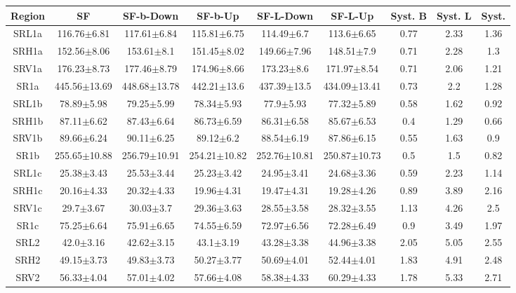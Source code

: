 \documentclass[12pt]{paper}
\begin{document}
\begin{table}[ht]\begin{center}\resizebox{\textwidth}{!}
{\begin{tabular}{c|ccccc|c|c|c}
    Region & SF & SF-b-Down & SF-b-Up & SF-L-Down & SF-L-Up & Syst. B & Syst. L & Syst. \\ 
\hline
SRL1a & 116.76$\pm$6.81 & 117.61$\pm$6.84 & 115.81$\pm$6.75 & 114.49$\pm$6.7 & 113.6$\pm$6.65 & 0.77 & 2.33 & 1.36\\ 
SRH1a & 152.56$\pm$8.06 & 153.61$\pm$8.1 & 151.45$\pm$8.02 & 149.66$\pm$7.96 & 148.51$\pm$7.9 & 0.71 & 2.28 & 1.3\\ 
SRV1a & 176.23$\pm$8.73 & 177.46$\pm$8.79 & 174.96$\pm$8.66 & 173.23$\pm$8.6 & 171.97$\pm$8.54 & 0.71 & 2.06 & 1.21\\ 
\hline
SR1a & 445.56$\pm$13.69 & 448.68$\pm$13.78 & 442.21$\pm$13.6 & 437.39$\pm$13.5 & 434.09$\pm$13.41 & 0.73 & 2.2 & 1.28\\ 
\hline
SRL1b & 78.89$\pm$5.98 & 79.25$\pm$5.99 & 78.34$\pm$5.93 & 77.9$\pm$5.93 & 77.32$\pm$5.89 & 0.58 & 1.62 & 0.92\\ 
SRH1b & 87.11$\pm$6.62 & 87.43$\pm$6.64 & 86.73$\pm$6.59 & 86.31$\pm$6.58 & 85.67$\pm$6.53 & 0.4 & 1.29 & 0.66\\ 
SRV1b & 89.66$\pm$6.24 & 90.11$\pm$6.25 & 89.12$\pm$6.2 & 88.54$\pm$6.19 & 87.86$\pm$6.15 & 0.55 & 1.63 & 0.9\\ 
\hline
SR1b & 255.65$\pm$10.88 & 256.79$\pm$10.91 & 254.21$\pm$10.82 & 252.76$\pm$10.81 & 250.87$\pm$10.73 & 0.5 & 1.5 & 0.82\\ 
\hline
SRL1c & 25.38$\pm$3.43 & 25.53$\pm$3.44 & 25.23$\pm$3.42 & 24.95$\pm$3.41 & 24.68$\pm$3.36 & 0.59 & 2.23 & 1.14\\ 
SRH1c & 20.16$\pm$4.33 & 20.32$\pm$4.33 & 19.96$\pm$4.31 & 19.47$\pm$4.31 & 19.28$\pm$4.26 & 0.89 & 3.89 & 2.16\\ 
SRV1c & 29.7$\pm$3.67 & 30.03$\pm$3.7 & 29.36$\pm$3.63 & 28.55$\pm$3.58 & 28.32$\pm$3.55 & 1.13 & 4.26 & 2.5\\ 
\hline
SR1c & 75.25$\pm$6.64 & 75.91$\pm$6.65 & 74.55$\pm$6.59 & 72.97$\pm$6.56 & 72.28$\pm$6.49 & 0.9 & 3.49 & 1.97\\ 
\hline
SRL2 & 42.0$\pm$3.16 & 42.62$\pm$3.15 & 43.1$\pm$3.19 & 43.28$\pm$3.38 & 44.96$\pm$3.38 & 2.05 & 5.05 & 2.55\\ 
SRH2 & 49.15$\pm$3.73 & 49.83$\pm$3.73 & 50.27$\pm$3.77 & 50.69$\pm$4.01 & 52.44$\pm$4.01 & 1.83 & 4.91 & 2.48\\ 
SRV2 & 56.33$\pm$4.04 & 57.01$\pm$4.02 & 57.66$\pm$4.08 & 58.38$\pm$4.33 & 60.29$\pm$4.33 & 1.78 & 5.33 & 2.71\\ 

\end{tabular}}
\end{center}
\end{table}
\end{document}
